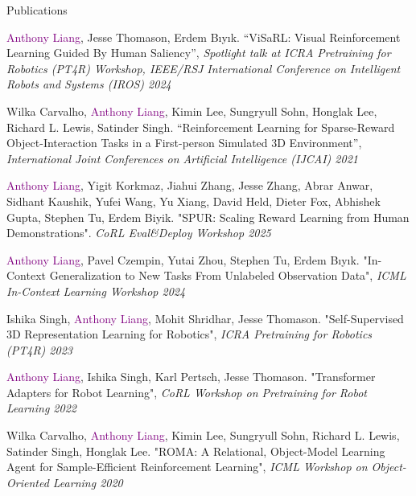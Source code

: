 \documentclass{resume}
\def\labelprefix{C}
\begin{document}
\begin{rSection}{Publications}
\begin{etaremune}
\item \textcolor{purple}{Anthony Liang}, Jesse Thomason, Erdem Bıyık. ``ViSaRL: Visual Reinforcement Learning Guided By Human Saliency'', \textit{Spotlight talk at ICRA Pretraining for Robotics (PT4R) Workshop, IEEE/RSJ International Conference on Intelligent Robots and Systems (IROS) 2024}

\item Wilka Carvalho, \textcolor{purple}{Anthony Liang}, Kimin Lee, Sungryull Sohn, Honglak Lee, Richard L. Lewis, Satinder Singh. ``Reinforcement Learning for Sparse-Reward Object-Interaction Tasks in a First-person Simulated 3D Environment'', \textit{International Joint Conferences on Artificial Intelligence (IJCAI) 2021}
\end{etaremune}

\def\labelprefix{T}
\begin{etaremune}
\item \textcolor{purple}{Anthony Liang}, Yigit Korkmaz, Jiahui Zhang, Jesse Zhang, Abrar Anwar, Sidhant Kaushik, Yufei Wang, Yu Xiang, David Held, Dieter Fox, Abhishek Gupta, Stephen Tu, Erdem Biyik. "SPUR: Scaling Reward Learning from Human Demonstrations". \textit{CoRL Eval\&Deploy Workshop 2025}

\item \textcolor{purple}{Anthony Liang}, Pavel Czempin, Yutai Zhou, Stephen Tu, Erdem Bıyık. "In-Context Generalization to New Tasks From Unlabeled Observation Data", \textit{ICML In-Context Learning Workshop 2024}

\item Ishika Singh, \textcolor{purple}{Anthony Liang}, Mohit Shridhar, Jesse Thomason. "Self-Supervised 3D Representation Learning for Robotics", \textit{ICRA Pretraining for Robotics (PT4R) 2023}

\item \textcolor{purple}{Anthony Liang}, Ishika Singh, Karl Pertsch, Jesse Thomason. "Transformer Adapters for Robot Learning", \textit{CoRL Workshop on Pretraining for Robot Learning 2022}

\item Wilka Carvalho, \textcolor{purple}{Anthony Liang}, Kimin Lee, Sungryull Sohn, Richard L. Lewis, Satinder Singh, Honglak Lee. "ROMA: A Relational, Object-Model Learning Agent for Sample-Efficient Reinforcement Learning", \textit{ICML Workshop on Object-Oriented Learning 2020}
\end{etaremune}
\end{rSection}
\end{document}
